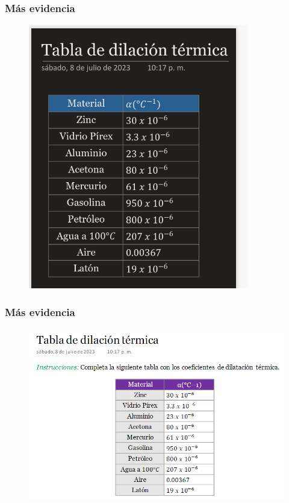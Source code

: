 \documentclass[14pt]{beamer}
\begin{document}
\begin{frame}
\frametitle{Más evidencia}
\begin{figure}
    \includegraphics[scale=0.6]{Imagenes/Evidencia_07.png}
\end{figure}
\end{frame}
\begin{frame}
\frametitle{Más evidencia}
\begin{figure}
    \includegraphics[scale=0.6]{Imagenes/Evidencia_08.png}
\end{figure}
\end{frame}
\end{document}
